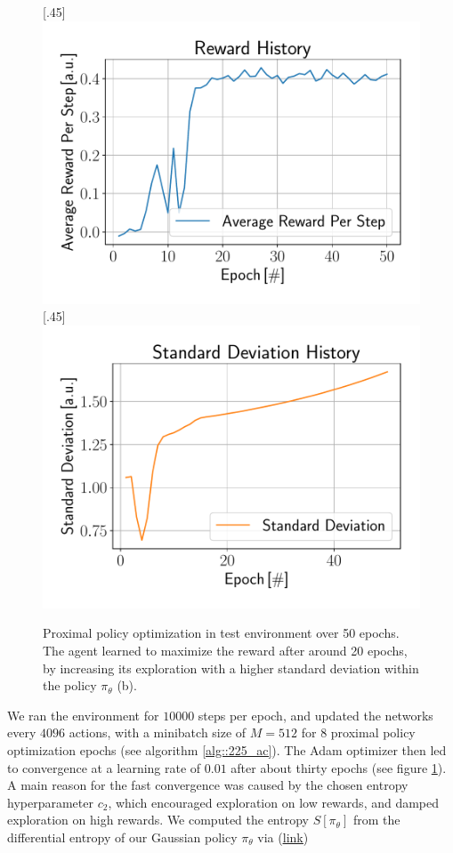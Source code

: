 \begin{figure}[h!]
	\centering
	[.45\linewidth]{\includegraphics[scale=.35]{chapters/04_experiments/02_autonomous_walking/ppo_reward_history.pdf}}	
	[.45\linewidth]{\includegraphics[scale=.35]{chapters/04_experiments/02_autonomous_walking/ppo_std_history.pdf}}
	\caption{Proximal policy optimization in test environment over 50 epochs. The agent learned to maximize the reward after around 20 epochs, by increasing its exploration with a higher standard deviation within the policy $\pi_\theta$ (b).}	
	\label{fig::425_ppo_hist}
\end{figure}
We ran the environment for $10000$ steps per epoch, and updated the networks every $4096$ actions, with a minibatch size of $M=512$ for $8$ proximal policy optimization epochs (see algorithm \ref{alg::225_ac}). The Adam optimizer then led to convergence at a learning rate of $0.01$ after about thirty epochs (see figure \ref{fig::425_ppo_hist}). A main reason for the fast convergence was caused by the chosen entropy hyperparameter $c_2$, which encouraged exploration on low rewards, and damped exploration on high rewards. We computed the entropy $S[\pi_\theta]$ from the differential entropy of our Gaussian policy $\pi_\theta$ via (\href{https://github.com/mhubii/ppo_libtorch/blob/481c1e326dcd6220b2c1c955a0303a410c2cb0dd/Models.h#L82}{\underline{link}})

